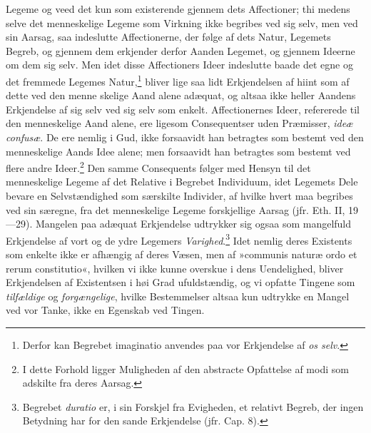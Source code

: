 \documentclass[12pt,a4paper]{book}
\newcommand{\opage}[1]{\marginnote{\footnotesize\textit{[#1]}}}
\begin{document}
Legeme og veed det kun som existerende gjennem dets
Affectioner; thi medens selve det menneskelige Legeme som
Virkning ikke begribes ved sig selv, men ved sin Aarsag, saa
indeslutte Affectionerne, der følge af dets Natur, Legemets
Begreb, og gjennem dem erkjender derfor Aanden Legemet, og
gjennem Ideerne om dem sig selv. Men idet disse Affectioners
Ideer indeslutte baade det egne og det fremmede Legemes
Natur,\footnote{Derfor kan Begrebet imaginatio anvendes paa
vor Erkjendelse af \emph{os selv}.} bliver lige saa lidt
Erkjendelsen af hiint som af dette ved den menne\-%
\opage{90}\setcounter{footnote}{0}%
skelige Aand alene adæquat, og altsaa ikke heller Aandens
Erkjendelse af sig selv ved sig selv som enkelt. Affectionernes
Ideer, refererede til den menneskelige Aand alene, ere ligesom
Consequentser uden Præmisser, \emph{ideæ confusæ}. De ere
nemlig i Gud, ikke forsaavidt han betragtes som bestemt ved
den menneskelige Aands Idee alene; men forsaavidt han
betragtes som bestemt ved flere andre Ideer.\footnote{I dette
Forhold ligger Muligheden af den abstracte Opfattelse af modi
som adskilte fra deres Aarsag.} Den samme Consequents følger
med Hensyn til det menneskelige Legeme af det Relative i
Begrebet Individuum, idet Legemets Dele bevare en
Selvstændighed som særskilte Individer, af hvilke hvert maa
begribes ved sin særegne, fra det menneskelige Legeme
forskjellige Aarsag (jfr. Eth. II, 19---29). Mangelen paa
adæquat Erkjendelse udtrykker sig ogsaa som mangelfuld
Erkjendelse af vort og de ydre Legemers \emph{Varighed}.\footnote{Begrebet
\emph{duratio} er, i sin Forskjel fra Evigheden, et relativt Begreb,
der ingen Betydning har for den sande Erkjendelse (jfr. Cap.
8).} Idet nemlig deres Existents som enkelte ikke er afhængig
af deres Væsen, men af »communis naturæ ordo et rerum
constitutio«, hvilken vi ikke kunne overskue i dens
Uendelighed, bliver Erkjendelsen af Existentsen i høi Grad
ufuldstændig, og vi opfatte Tingene som \emph{tilfældige} og
\emph{forgængelige}, hvilke Bestemmelser altsaa kun udtrykke en
Mangel ved vor Tanke, ikke en Egenskab ved Tingen.
\end{document}
